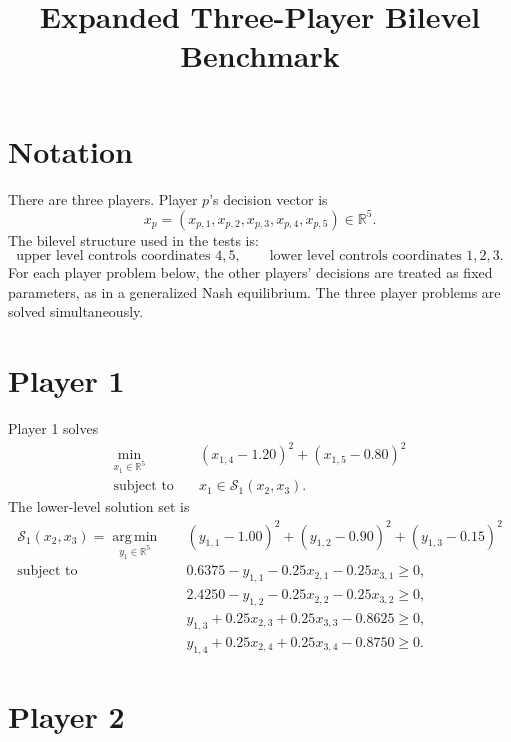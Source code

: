 \documentclass[11pt]{article}
\title{Expanded Three-Player Bilevel Benchmark}
\author{}
\date{}
\begin{document}
\maketitle

\section*{Notation}

There are three players. Player \(p\)'s decision vector is
\[
  x_p = (x_{p,1},x_{p,2},x_{p,3},x_{p,4},x_{p,5}) \in \mathbb{R}^5.
\]
The bilevel structure used in the tests is:
\[
  \text{upper level controls coordinates } 4,5,
  \qquad
  \text{lower level controls coordinates } 1,2,3.
\]
For each player problem below, the other players' decisions are treated as
fixed parameters, as in a generalized Nash equilibrium. The three player
problems are solved simultaneously.

\section*{Player 1}

Player 1 solves
\[
\begin{aligned}
  \min_{x_1 \in \mathbb{R}^5}
  \quad &
    (x_{1,4}-1.20)^2 + (x_{1,5}-0.80)^2 \\
  \text{subject to}
  \quad &
    x_1 \in \mathcal{S}_1(x_2,x_3).
\end{aligned}
\]
The lower-level solution set is
\[
\begin{aligned}
  \mathcal{S}_1(x_2,x_3)
  =
  \operatorname*{arg\,min}_{y_1 \in \mathbb{R}^5}
  \quad &
    (y_{1,1}-1.00)^2
    +(y_{1,2}-0.90)^2
    +(y_{1,3}-0.15)^2\\
  \text{subject to}
  \quad &
    0.6375 - y_{1,1} - 0.25x_{2,1} - 0.25x_{3,1} \ge 0,\\
  &
    2.4250 - y_{1,2} - 0.25x_{2,2} - 0.25x_{3,2} \ge 0,\\
  &
    y_{1,3} + 0.25x_{2,3} + 0.25x_{3,3} - 0.8625 \ge 0,\\
  &
    y_{1,4} + 0.25x_{2,4} + 0.25x_{3,4} - 0.8750 \ge 0.
\end{aligned}
\]

\section*{Player 2}
\end{document}

